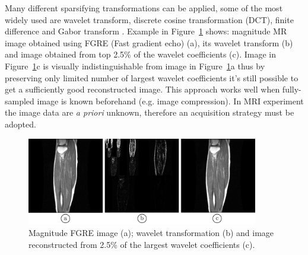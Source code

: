 Many different sparsifying transformations can be applied, some of the most widely used are wavelet transform, discrete cosine transformation (DCT), finite difference and Gabor transform \cite{Baker:2016vs}. 
Example in Figure~\ref{WaveletCSExample} shows: magnitude MR image obtained using FGRE (Fast gradient echo) (a), its wavelet transform (b) and image obtained from top 2.5\% of the wavelet coefficients (c).
Image in Figure~\ref{WaveletCSExample}c is visually indistinguishable from image in Figure~\ref{WaveletCSExample}a thus by preserving only limited number of largest wavelet coefficients it's still possible to get a sufficiently good reconstructed image.
This approach works well when fully-sampled image is known beforehand (e.g. image compression).
In MRI experiment the image data are \textit{a priori} unknown, therefore an acquisition strategy must be adopted.
\begin{figure}[!htb]
\vspace{+0.2cm}
    \centering
    \includegraphics[width=0.9\textwidth]{Figures/CS2.pdf}
    \caption[MRI image reconstructed from top 2.5\% of its wavelet coefficients]{Magnitude FGRE image (a); wavelet transformation (b) and image reconstructed from 2.5\% of the largest wavelet coefficients (c).}
    \label{WaveletCSExample}
\end{figure}
\FloatBarrier
